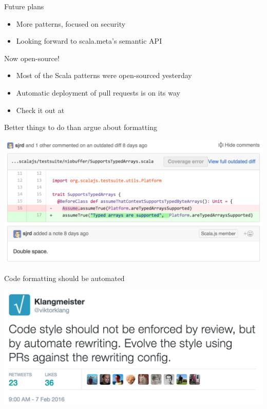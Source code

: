 \documentclass[svgnames,dvipsnames,hyperref={bookmarks=false},usepdftitle=false]{beamer}
\begin{document}
\begin{frame}{Future plans}
\begin{itemize}
\item More patterns, focused on security
\item Looking forward to scala.meta's semantic API
\end{itemize}
\end{frame}

\begin{frame}{Now open-source!}
\begin{itemize}
\item Most of the Scala patterns were open-sourced yesterday
\item Automatic deployment of pull requests is on its way
\item Check it out at 
\end{itemize}
\end{frame}


\begin{frame}[c, fragile]{Better things to do than argue about formatting}
\vskip20pt
\begin{center}
\includegraphics[width=0.9\linewidth]{time-sink.png}
\end{center}
\end{frame}

\begin{frame}[c, fragile]{Code formatting should be automated}
\vskip20pt
\begin{center}
\includegraphics[width=0.9\linewidth]{klang.png}
\end{center}
\end{frame}
\end{document}
